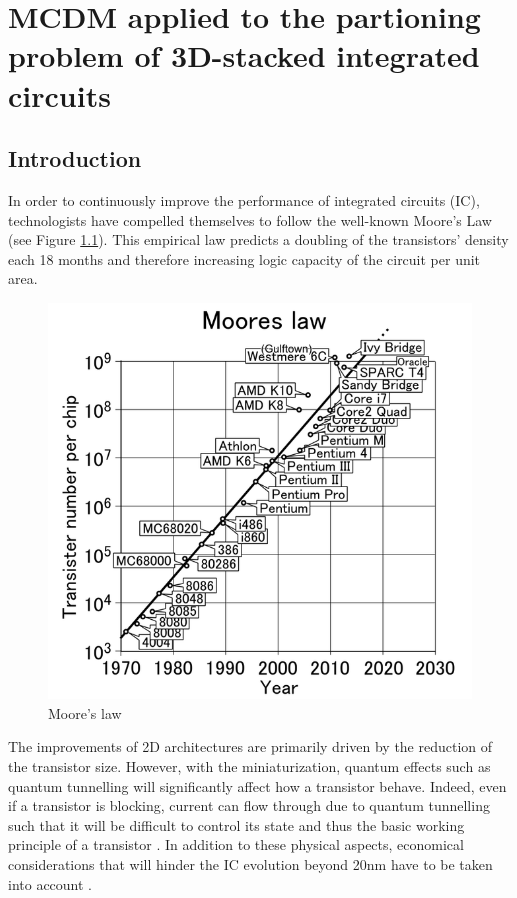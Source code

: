 \documentclass{svmono}
\begin{document}
\chapter{MCDM applied to the partioning problem of 3D-stacked integrated circuits}

\section{Introduction}

In order to continuously improve the performance of integrated circuits (IC), technologists have compelled themselves to follow the well-known Moore's Law (see Figure \ref{fig:mooreslaw}). This empirical law predicts a doubling of the transistors' density each 18 months and therefore increasing logic capacity of the circuit per unit area.

\begin{figure}
\begin{center}
\includegraphics[width=0.7\linewidth]{mooreslaw.png}
\end{center}
\vspace{-0.5cm}
\caption{Moore's law \cite{mooreslawpic}}
\label{fig:mooreslaw}
\end{figure}

The improvements of 2D architectures are primarily driven by the reduction of the transistor size. However, with the miniaturization, quantum effects such as quantum tunnelling will significantly affect how a transistor behave. Indeed, even if a transistor is blocking, current can flow through due to quantum tunnelling such that it will be difficult to control its state and thus the basic working principle of a transistor \cite{1240081}. In addition to these physical aspects, economical considerations that will hinder the IC evolution beyond 20nm have to be taken into account \cite{5227192,PFF10}.
\end{document}
